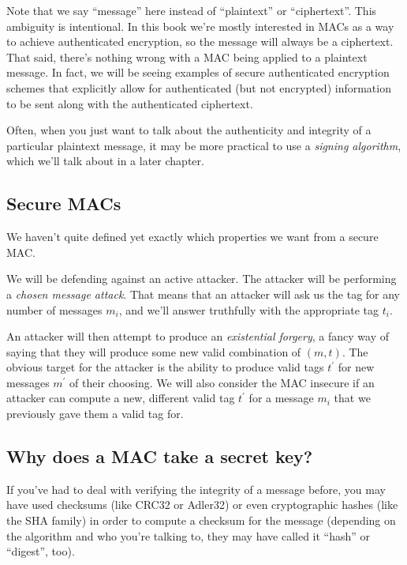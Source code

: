 \documentclass[11pt,ebook,table,dvipsnames]{memoir}
\begin{document}
Note that we say \enquote{message} here instead of \enquote{plaintext} or
\enquote{ciphertext}. This ambiguity is intentional. In this book we're mostly
interested in MACs as a way to achieve authenticated encryption, so
the message will always be a ciphertext. That said, there's nothing
wrong with a MAC being applied to a plaintext message. In fact, we
will be seeing examples of secure authenticated encryption schemes
that explicitly allow for authenticated (but not encrypted)
information to be sent along with the authenticated ciphertext.

Often, when you just want to talk about the authenticity and integrity
of a particular plaintext message, it may be more practical to use a
\emph{signing algorithm}, which we'll talk about in a later chapter.

\subsection{Secure MACs}
\label{sec-2-7-1-1}

We haven't quite defined yet exactly which properties we want from a
secure MAC.

We will be defending against an active attacker. The attacker will be
performing a \emph{chosen message attack}. That means that an attacker will
ask us the tag for any number of messages $m_i$, and we'll answer
truthfully with the appropriate tag $t_i$.

An attacker will then attempt to produce an \emph{existential forgery}, a
fancy way of saying that they will produce some new valid combination
of $(m, t)$. The obvious target for the attacker is the ability to
produce valid tags $t^{\prime}$ for new messages $m^{\prime}$ of their
choosing. We will also consider the MAC insecure if an attacker can
compute a new, different valid tag $t^{\prime}$ for a message $m_i$
that we previously gave them a valid tag for.
\subsection{Why does a MAC take a secret key?}
\label{sec-2-7-1-2}

If you've had to deal with verifying the integrity of a message
before, you may have used checksums (like CRC32 or Adler32) or even
cryptographic hashes (like the SHA family) in order to compute a
checksum for the message (depending on the algorithm and who you're
talking to, they may have called it \enquote{hash} or \enquote{digest}, too).
\end{document}
